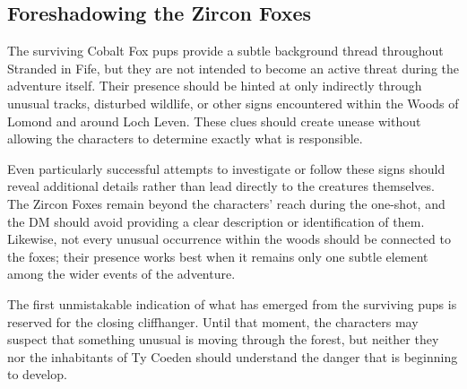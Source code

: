 \subsection*{Foreshadowing the Zircon Foxes}
{\entryfont The surviving Cobalt Fox pups provide a subtle background thread throughout Stranded in Fife, but they are not intended to become an active threat during the adventure itself. Their presence should be hinted at only indirectly through unusual tracks, disturbed wildlife, or other signs encountered within the Woods of Lomond and around Loch Leven. These clues should create unease without allowing the characters to determine exactly what is responsible.

Even particularly successful attempts to investigate or follow these signs should reveal additional details rather than lead directly to the creatures themselves. The Zircon Foxes remain beyond the characters' reach during the one-shot, and the DM should avoid providing a clear description or identification of them. Likewise, not every unusual occurrence within the woods should be connected to the foxes; their presence works best when it remains only one subtle element among the wider events of the adventure.

The first unmistakable indication of what has emerged from the surviving pups is reserved for the closing cliffhanger. Until that moment, the characters may suspect that something unusual is moving through the forest, but neither they nor the inhabitants of Ty Coeden should understand the danger that is beginning to develop.}